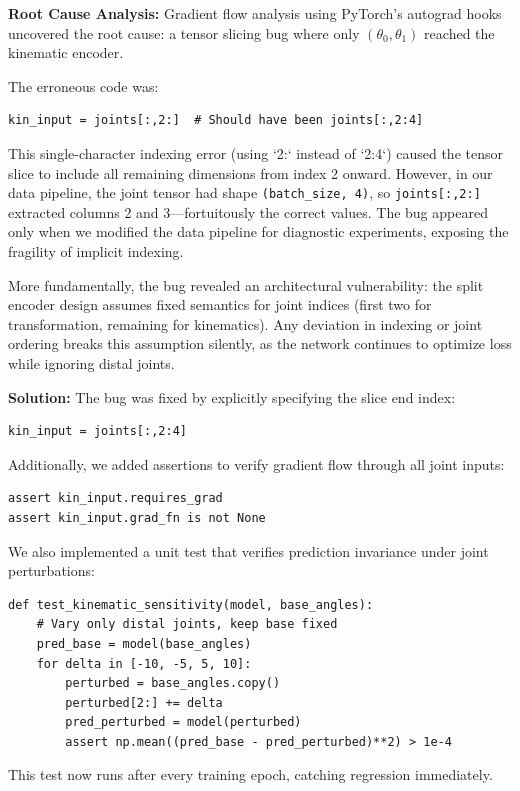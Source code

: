 \documentclass[12pt,a4paper,oneside]{report}
\begin{document}
\textbf{Root Cause Analysis:} Gradient flow analysis using PyTorch's autograd hooks uncovered the root cause: a tensor slicing bug where only $(\theta_0, \theta_1)$ reached the kinematic encoder.

The erroneous code was:
\begin{verbatim}
kin_input = joints[:,2:]  # Should have been joints[:,2:4]
\end{verbatim}

This single-character indexing error (using `2:` instead of `2:4`) caused the tensor slice to include all remaining dimensions from index 2 onward. However, in our data pipeline, the joint tensor had shape \texttt{(batch\_size, 4)}, so \texttt{joints[:,2:]} extracted columns 2 and 3---fortuitously the correct values. The bug appeared only when we modified the data pipeline for diagnostic experiments, exposing the fragility of implicit indexing.

More fundamentally, the bug revealed an architectural vulnerability: the split encoder design assumes fixed semantics for joint indices (first two for transformation, remaining for kinematics). Any deviation in indexing or joint ordering breaks this assumption silently, as the network continues to optimize loss while ignoring distal joints.

\textbf{Solution:} The bug was fixed by explicitly specifying the slice end index:
\begin{verbatim}
kin_input = joints[:,2:4]
\end{verbatim}

Additionally, we added assertions to verify gradient flow through all joint inputs:
\begin{verbatim}
assert kin_input.requires_grad
assert kin_input.grad_fn is not None
\end{verbatim}

We also implemented a unit test that verifies prediction invariance under joint perturbations:

{\footnotesize
\begin{verbatim}
def test_kinematic_sensitivity(model, base_angles):
    # Vary only distal joints, keep base fixed
    pred_base = model(base_angles)
    for delta in [-10, -5, 5, 10]:
        perturbed = base_angles.copy()
        perturbed[2:] += delta
        pred_perturbed = model(perturbed)
        assert np.mean((pred_base - pred_perturbed)**2) > 1e-4
\end{verbatim}
}

This test now runs after every training epoch, catching regression immediately.
\end{document}

